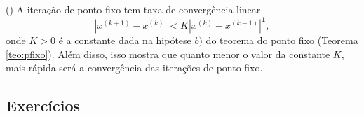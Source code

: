 \begin{obs}()
  A iteração de ponto fixo tem taxa de convergência linear
  \begin{equation}
    |x^{(k+1)} - x^{(k)}| < K|x^{(k)} - x^{(k-1)}|^{\pmb{1}},
  \end{equation}
onde $K > 0$ é a constante dada na hipótese $b)$ do teorema do ponto fixo (Teorema \ref{teo:pfixo}). Além disso, isso mostra que quanto menor o valor da constante $K$, mais rápida será a convergência das iterações de ponto fixo.
\end{obs}

\subsection*{Exercícios}

\emconstrucao